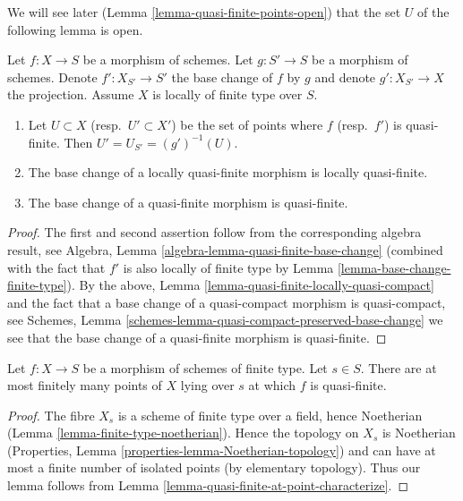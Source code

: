 \noindent
We will see later (Lemma \ref{lemma-quasi-finite-points-open})
that the set $U$ of the following lemma is open.

\begin{lemma}
\label{lemma-base-change-quasi-finite}
Let $f : X \to S$ be a morphism of schemes.
Let $g : S' \to S$ be a morphism of schemes.
Denote $f' : X_{S'} \to S'$ the base change of $f$ by $g$
and denote $g' : X_{S'} \to X$ the projection.
Assume $X$ is locally of finite type over $S$.
\begin{enumerate}
\item Let $U \subset X$ (resp.\ $U' \subset X'$)
be the set of points where $f$ (resp.\ $f'$) is quasi-finite.
Then $U' = U_{S'} = (g')^{-1}(U)$.
\item The base change of a locally quasi-finite morphism is
locally quasi-finite.
\item The base change of a quasi-finite morphism is
quasi-finite.
\end{enumerate}
\end{lemma}

\begin{proof}
The first and second assertion follow from the corresponding
algebra result, see
Algebra, Lemma \ref{algebra-lemma-quasi-finite-base-change}
(combined with the fact that $f'$ is also locally of finite type by
Lemma \ref{lemma-base-change-finite-type}).
By the above, Lemma \ref{lemma-quasi-finite-locally-quasi-compact}
and the fact that a base change of a
quasi-compact morphism is quasi-compact, see
Schemes, Lemma \ref{schemes-lemma-quasi-compact-preserved-base-change}
we see that the base change of a quasi-finite morphism
is quasi-finite.
\end{proof}

\begin{lemma}
\label{lemma-quasi-finite-at-a-finite-number-of-points}
Let $f : X \to S$ be a morphism of schemes of finite type.
Let $s \in S$. There are at most finitely many points
of $X$ lying over $s$ at which $f$ is quasi-finite.
\end{lemma}

\begin{proof}
The fibre $X_s$ is a scheme of finite type over a field,
hence Noetherian (Lemma \ref{lemma-finite-type-noetherian}).
Hence the topology on $X_s$ is Noetherian (Properties, Lemma
\ref{properties-lemma-Noetherian-topology})
and can have at most a finite number of isolated points (by elementary
topology). Thus our lemma follows from
Lemma \ref{lemma-quasi-finite-at-point-characterize}.
\end{proof}

